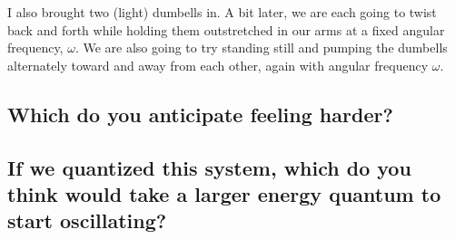 \documentclass[11pt]{article}
\begin{document}
I also brought two (light) dumbells in.  A bit later, we are each going to 
twist back and forth while holding them outstretched in our arms at a fixed angular 
frequency, $\omega$.  We are also going to try
standing still and pumping the dumbells alternately toward and away from each other, again
with angular frequency $\omega$.
\subsection{Which do you anticipate feeling harder?}
\vspace{0.25in}
\subsection{If we quantized this system, which do you think would take a larger
energy quantum to start oscillating?}
\vspace{0.25in}
\end{document}

